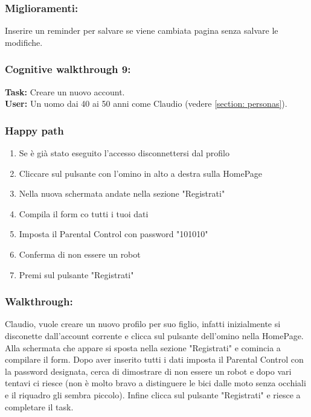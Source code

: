\documentclass[../Report.tex]{subfiles}
\begin{document}
    \subsubsection{Miglioramenti:}
    Inserire un reminder per salvare se viene cambiata pagina senza salvare le modifiche.
    \subsubsection{Cognitive walkthrough 9:}
    \textbf{Task:} Creare un nuovo account.\\
    \textbf{User:} Un uomo dai 40 ai 50 anni come Claudio (vedere \ref{section: personas}).\\

    \subsubsection{Happy path}
    \begin{enumerate}
        \item Se è già stato eseguito l'accesso disconnettersi dal profilo
        \item Cliccare sul pulsante con l’omino in alto a destra sulla HomePage
        \item Nella nuova schermata andate nella sezione "Registrati" 
        \item Compila il form co tutti i tuoi dati
        \item Imposta il Parental Control con password "101010"
        \item Conferma di non essere un robot
        \item Premi sul pulsante "Registrati"
    \end{enumerate}

    \subsubsection{Walkthrough:}
    Claudio, vuole creare un nuovo profilo per suo figlio, infatti inizialmente si disconette dall'account corrente e clicca sul pulsante dell'omino nella HomePage.
    Alla schermata che appare si sposta nella sezione "Registrati" e comincia a compilare il form. Dopo aver inserito tutti i dati imposta il Parental Control con la password designata, cerca di dimostrare di non essere un robot e dopo vari tentavi ci riesce (non è molto bravo a distinguere le bici dalle moto senza occhiali e il riquadro gli sembra piccolo). Infine clicca sul pulsante "Registrati" e riesce a completare il task.
\end{document}
